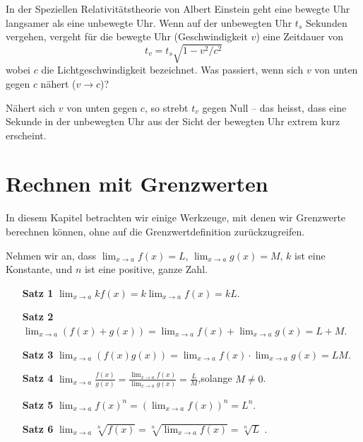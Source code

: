 \begin{exercises}
\begin{exercise}
In der Speziellen Relativitätstheorie von Albert Einstein geht eine bewegte Uhr langsamer als eine unbewegte Uhr. Wenn auf der unbewegten Uhr $t_s$ Sekunden vergehen, vergeht für die bewegte Uhr (Geschwindigkeit $v$) eine Zeitdauer von
\[
t_v = t_s \sqrt{1 - v^2/c^2}
\]
wobei $c$ die Lichtgeschwindigkeit bezeichnet. Was passiert, wenn sich $v$ von unten gegen $c$ nähert ($v\to c$)?
\begin{answer}
Nähert sich $v$ von unten gegen $c$, so strebt $t_v$ gegen Null -- das heisst, dass eine Sekunde in der unbewegten Uhr aus der Sicht der bewegten Uhr extrem kurz erscheint.
\end{answer}
\end{exercise}


\end{exercises}


\section{Rechnen mit Grenzwerten}

In diesem Kapitel betrachten wir einige Werkzeuge, mit denen wir Grenzwerte berechnen können, ohne auf die Grenzwertdefinition zurückzugreifen.


\begin{mainTheorem}[Grenzwertsätze]\label{theorem:limit-laws}
Nehmen wir an, dass $\lim_{x\to a}f(x)=L$, $\lim_{x\to a}g(x)=M$, $k$
ist eine Konstante, und $n$ ist eine positive, ganze Zahl.
\begin{itemize}
\item[\textbf{Satz 1}] $\lim_{x\to a} kf(x) = k\lim_{x\to a}f(x)=kL$.
\item[\textbf{Satz 2}] $\lim_{x\to a} (f(x)+g(x)) = \lim_{x\to a}f(x)+\lim_{x\to a}g(x)=L+M$.  
\item[\textbf{Satz 3}] $\lim_{x\to a} (f(x)g(x)) = \lim_{x\to a}f(x)\cdot\lim_{x\to a}g(x)=LM$. 
\item[\textbf{Satz 4}] $\lim_{x\to a} \frac{f(x)}{g(x)} =
  \frac{\lim_{x\to a}f(x)}{\lim_{x\to a}g(x)}=\frac{L}{M}$,solange $M\ne0$.
\item[\textbf{Satz 5}] $\lim_{x\to a} f(x)^n = \left(\lim_{x\to a}f(x)\right)^n=L^n$.
\item[\textbf{Satz 6}] $\lim_{x\to a} \sqrt[n]{f(x)} = \sqrt[n]{\lim_{x\to
    a}f(x)}=\sqrt[n]{L}$ .
\end{itemize}
\label{thm:limit laws}
\end{mainTheorem}

